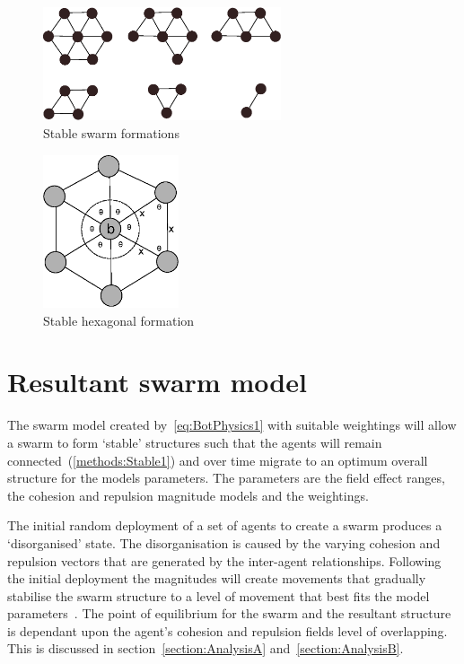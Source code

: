 \begin{figure}[H]
\begin{center}
\includegraphics[width=7cm]{CHAPTER-2/figures/StableForms}
\end{center}
\caption{Stable swarm formations}\label{fig:StableForms}
\end{figure}

\begin{figure}[H]
\begin{center}
\includegraphics[width=4cm]{CHAPTER-2/figures/Hexagon}
\end{center}
\caption{Stable hexagonal formation}\label{fig:StableFormHexagon}
\end{figure}



\section{Resultant swarm model}
The swarm model created by~\autoref{eq:BotPhysics1} with suitable weightings will allow a swarm to form `stable' structures such that the agents will remain connected~(\autoref{methods:Stable1}) and over time migrate to an optimum overall structure for the models parameters. The parameters are the field effect ranges, the cohesion and repulsion magnitude models and the weightings. 

The initial random deployment of a set of agents to create a swarm produces a `disorganised' state. The disorganisation is caused by the varying cohesion and repulsion vectors that are generated by the inter-agent relationships. Following the initial deployment the magnitudes will create movements that gradually stabilise the swarm structure to a level of movement that best fits the model parameters~\cite{PG:08, WF:12}. The point of equilibrium for the swarm and the resultant structure is dependant upon the agent's cohesion and repulsion fields level of overlapping. This is discussed in section~\autoref{section:AnalysisA} and~\autoref{section:AnalysisB}.

